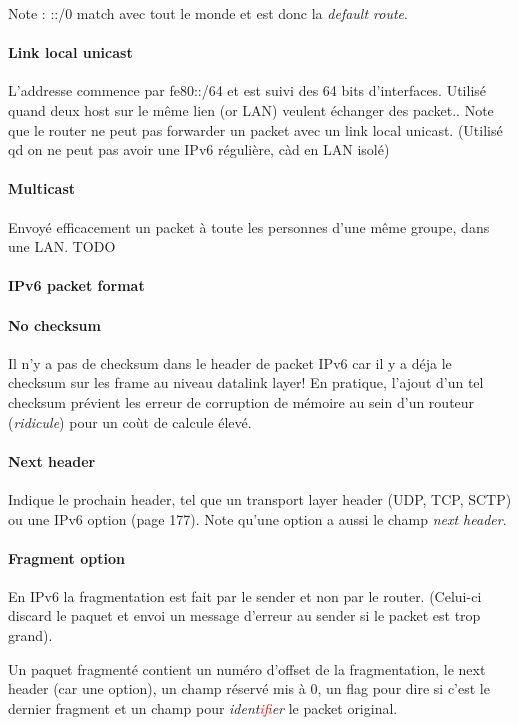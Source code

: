 Note : ::/0 match avec tout le monde et est donc la \textit{default route}.

\paragraph{Link local unicast}
L'addresse commence par fe80::/64 et est suivi des 64 bits d'interfaces.
Utilisé quand deux host sur le même lien (or LAN) veulent échanger des
packet.. Note que le router ne peut pas forwarder un packet avec un
link local unicast.
(Utilisé qd on ne peut pas avoir une IPv6 régulière, càd en LAN isolé)


\paragraph{Multicast}
Envoyé efficacement un packet à toute les personnes d'une même groupe, dans une LAN.
TODO

\paragraph{IPv6 packet format}

\paragraph{No checksum}
Il n'y a pas de checksum dans le header de packet IPv6 car il y a déja le checksum
sur les frame au niveau datalink layer! En pratique, l'ajout d'un tel checksum prévient
les erreur de corruption de mémoire au sein d'un routeur (\textit{ridicule}) pour un coùt de
calcule élevé.

\paragraph{Next header}
Indique le prochain header, tel que un transport layer header (UDP, TCP, SCTP) ou une
IPv6 option (page 177). Note qu'une option a aussi le champ \textit{next header}.

\paragraph{Fragment option}
En IPv6 la fragmentation est fait par le sender et non par le router. (Celui-ci discard
le paquet et envoi un message d'erreur au sender si le packet est trop grand).

Un paquet fragmenté contient un numéro d'offset de la fragmentation, le next header (car une option), un champ réservé mis à 0, un flag pour dire si c'est le dernier fragment et un
champ pour \textit{ident\textcolor{red}{if}ier} le packet original.

